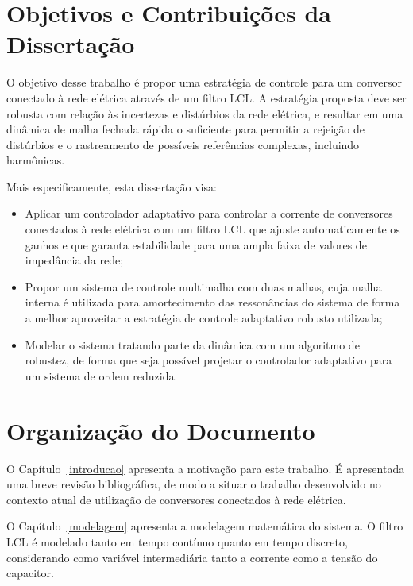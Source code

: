 \section{Objetivos e Contribuições da Dissertação}

	O objetivo desse trabalho é propor uma estratégia de controle para um conversor conectado à rede elétrica através de um filtro LCL. A estratégia proposta deve ser robusta com relação às incertezas e distúrbios da rede elétrica, e resultar em uma dinâmica de malha fechada rápida o suficiente para permitir a rejeição de distúrbios e o rastreamento de possíveis referências complexas, incluindo harmônicas.

	Mais especificamente, esta dissertação visa:

	\begin{itemize}
		\item Aplicar um controlador adaptativo para controlar a corrente de conversores conectados à rede elétrica com um filtro LCL que ajuste automaticamente os ganhos e que garanta estabilidade para uma ampla faixa de valores de impedância da rede;
    \item Propor um sistema de controle multimalha com duas malhas, cuja malha interna é utilizada para amortecimento das ressonâncias do sistema de forma a melhor aproveitar a estratégia de controle adaptativo robusto utilizada;
    \item Modelar o sistema tratando parte da dinâmica com um algoritmo de robustez, de forma que seja possível projetar o controlador adaptativo para um sistema de ordem reduzida.
	\end{itemize}


\section{Organização do Documento}

	O Capítulo~\ref{introducao} apresenta a motivação para este trabalho. É apresentada uma breve revisão bibliográfica, de modo a situar o trabalho desenvolvido no contexto atual de utilização de conversores conectados à rede elétrica.

	O Capítulo~\ref{modelagem} apresenta a modelagem matemática do sistema. O filtro LCL é modelado tanto em tempo contínuo quanto em tempo discreto, considerando como variável intermediária tanto a corrente como a tensão do capacitor.

